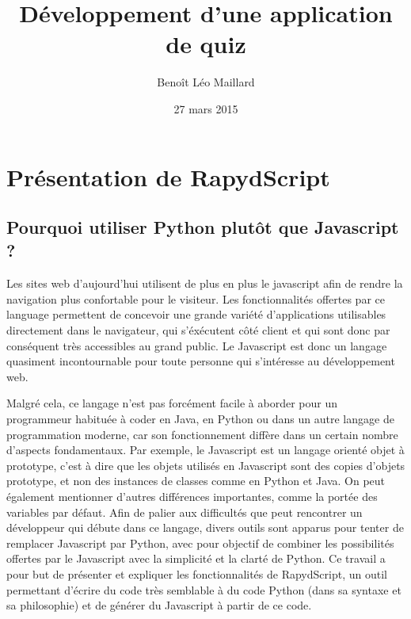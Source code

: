 \documentclass[a4,10pt,french]{sphinxmanual}
\title{Développement d'une application de quiz}
\date{27 mars 2015}
\author{Benoît Léo Maillard}
\begin{document}
\maketitle
\tableofcontents
{}\label{index::doc}



\chapter{Présentation de RapydScript}
\label{rapydscript:application-de-creation-de-quiz}\label{rapydscript:presentation-de-rapydscript}\label{rapydscript::doc}

\section{Pourquoi utiliser Python plutôt que Javascript ?}
\label{rapydscript:pourquoi-utiliser-python-plutot-que-javascript}
Les sites web d'aujourd'hui utilisent de plus en plus le javascript afin de rendre la navigation plus confortable pour le visiteur. Les fonctionnalités offertes par ce language permettent de concevoir une grande variété d'applications utilisables directement dans le navigateur, qui s'éxécutent côté client et qui sont donc par conséquent très accessibles au grand public. Le Javascript est donc un langage quasiment incontournable pour toute personne qui s'intéresse au développement web.

Malgré cela, ce langage n'est pas forcément facile à aborder pour un programmeur habituée à coder en Java, en Python ou dans un autre langage de programmation moderne, car son fonctionnement diffère dans un certain nombre d'aspects fondamentaux. Par exemple, le Javascript est un langage orienté objet à prototype, c'est à dire que les objets utilisés en Javascript sont des copies d'objets prototype, et non des instances de classes comme en Python et Java. On peut également mentionner d'autres différences importantes, comme la portée des variables par défaut. Afin de palier aux difficultés que peut rencontrer un développeur qui débute dans ce langage, divers outils sont apparus pour tenter de remplacer Javascript par Python, avec pour objectif de combiner les possibilités offertes par le Javascript avec la simplicité et la clarté de Python. Ce travail a pour but de présenter et expliquer les fonctionnalités de RapydScript, un outil permettant d'écrire du code très semblable à du code Python (dans sa syntaxe et sa philosophie) et de générer du Javascript à partir de ce code.
\end{document}
